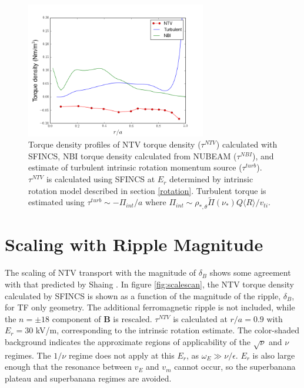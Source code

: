 \documentclass{article}
\numberwithin{figure}{section}
\numberwithin{equation}{section}
\begin{document}
\begin{figure}[h!]
\centering
\includegraphics[width=0.7\textwidth]{AllTorquePlot.png}
\caption{\label{fig:alltorque} Torque density profiles of NTV torque density ($\tau^{NTV}$) calculated with SFINCS, NBI torque density calculated from NUBEAM ($\tau^{NBI}$), and estimate of turbulent intrinsic rotation momentum source ($\tau^{turb}$). $\tau^{NTV}$ is calculated using SFINCS at $E_r$ determined by intrinsic rotation model described in section \ref{rotation}. Turbulent torque is estimated using $\tau^{turb} \sim -\Pi_{int}/a$ where $\Pi_{int} \sim \rho_{*, \theta} \widetilde{\Pi}(\nu_*) Q \langle R \rangle/v_{ti}$.}
\end{figure}

\FloatBarrier

\section{Scaling with Ripple Magnitude}\label{scaling}
The scaling of NTV transport with the magnitude of $\delta_B$ shows some agreement with that predicted by Shaing \cite{Shaing2008}. In figure \ref{fig:scalescan}, the NTV torque density calculated by SFINCS is shown as a function of the magnitude of the ripple, $\delta_B$, for TF only geometry. The additional ferromagnetic ripple is not included, while the $n= \pm18$ component of $\bm{B}$ is rescaled. $\tau^{NTV}$ is calculated at $r/a = 0.9$ with $E_r = 30$ kV/m, corresponding to the intrinsic rotation estimate. The color-shaded background indicates the approximate regions of applicability of the $\sqrt{\nu}$ and $\nu$ regimes. The $1/\nu$ regime does not apply at this $E_r$, as $\omega_E \gg \nu/\epsilon$. $E_r$ is also large enough that the resonance between $v_{E}$ and $v_{m}$ cannot occur, so the superbanana plateau and superbanana regimes are avoided. 
\end{document}
